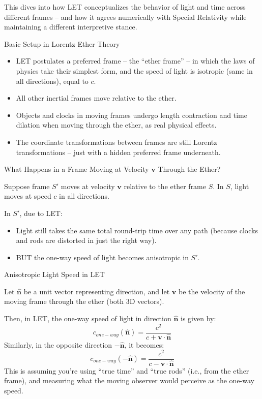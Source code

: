\documentclass[a4paper]{article}
\theoremstyle{plain}
\theoremstyle{definition}
\newcommand{\vect}[1]{\mathbf{#1}}
\newcommand{\hatvec}[1]{\hat{\mathbf{#1}}}
\begin{document}
This dives into how LET conceptualizes the behavior of light and time
across different frames -- and how it agrees numerically with Special
Relativity while maintaining a different interpretive stance.


Basic Setup in Lorentz Ether Theory

\begin{itemize}
\item LET postulates a preferred frame -- the ``ether frame'' -- in
  which the laws of physics take their simplest form, and the speed of
  light is isotropic (same in all directions), equal to $c$.
\item All other inertial frames move relative to the ether.
\item Objects and clocks in moving frames undergo length contraction
  and time dilation when moving through the ether, as real physical
  effects.
\item The coordinate transformations between frames are still Lorentz
  transformations -- just with a hidden preferred frame underneath.
\end{itemize}

What Happens in a Frame Moving at Velocity $\vect{v}$ Through the Ether?

Suppose frame $S'$ moves at velocity $\vect{v}$ relative to the ether
frame $S$.  In $S$, light moves at speed $c$ in all directions.

In $S'$, due to LET:
\begin{itemize}
\item Light still takes the same total round-trip time over any path
  (because clocks and rods are distorted in just the right way).
\item BUT the one-way speed of light becomes anisotropic in $S'$.
\end{itemize}

Anisotropic Light Speed in LET

Let $\hatvec{n}$ be a unit vector representing direction, and let
$\vect{v}$ be the velocity of the moving frame through the ether (both
3D vectors).

Then, in LET, the one-way speed of light in direction $\hatvec{n}$ is
given by:
\begin{equation}
c_{one-way}(\hatvec{n}) = \frac{c^2}{c + \vect{v}\cdot\hatvec{n}}
\end{equation}
Similarly, in the opposite direction $-\hatvec{n}$, it becomes:
\begin{equation}
c_{one-way}(-\hatvec{n}) = \frac{c^2}{c - \vect{v}\cdot\hatvec{n}}
\end{equation}
This is assuming you're using ``true time'' and ``true rods'' (i.e.,
from the ether frame), and measuring what the moving observer would
perceive as the one-way speed.
\end{document}
